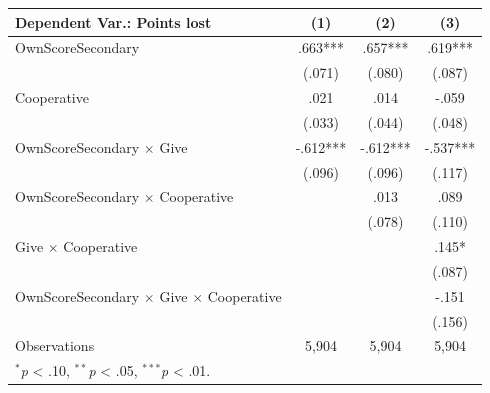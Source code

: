 \begingroup
\centering
\begin{tabular*}{\linewidth}{@{\extracolsep{\fill}}lccc}
   \toprule
   Dependent Var.: Points lost & \multicolumn{1}{c}{(1)} & \multicolumn{1}{c}{(2)} & \multicolumn{1}{c}{(3)}\\
   \midrule
   OwnScoreSecondary & \mbox{\hphantom{8}.663***} & \mbox{\hphantom{8}.657***} & \mbox{\hphantom{8}.619***}\\
    & \mbox{(.071)\hphantom{88}} & \mbox{(.080)\hphantom{88}} & \mbox{(.087)\hphantom{88}}\\
   Cooperative & \mbox{\hphantom{8}.021\hphantom{888}} & \mbox{\hphantom{8}.014\hphantom{888}} & \mbox{-.059\hphantom{888}}\\
    & \mbox{(.033)\hphantom{88}} & \mbox{(.044)\hphantom{88}} & \mbox{(.048)\hphantom{88}}\\
   OwnScoreSecondary $\times$ Give & \mbox{-.612***} & \mbox{-.612***} & \mbox{-.537***}\\
    & \mbox{(.096)\hphantom{88}} & \mbox{(.096)\hphantom{88}} & \mbox{(.117)\hphantom{88}}\\
   OwnScoreSecondary $\times$ Cooperative &  & \mbox{\hphantom{8}.013\hphantom{888}} & \mbox{\hphantom{8}.089\hphantom{888}}\\
    &  & \mbox{(.078)\hphantom{88}} & \mbox{(.110)\hphantom{88}}\\
   Give $\times$ Cooperative &  &  & \mbox{\hphantom{8}.145*\hphantom{88}}\\
    &  &  & \mbox{(.087)\hphantom{88}}\\
   OwnScoreSecondary $\times$ Give $\times$ Cooperative &  &  & \mbox{-.151\hphantom{888}}\\
    &  &  & \mbox{(.156)\hphantom{88}}\\
   \midrule
   Observations & 5,904 & 5,904 & 5,904\\
   \multicolumn{4}{l}{\footnotesize $^{*}$\textit{p} < .10, $^{**}$\textit{p} < .05, $^{***}$\textit{p} < .01.}\\
   \bottomrule
\end{tabular*}
\par\endgroup
